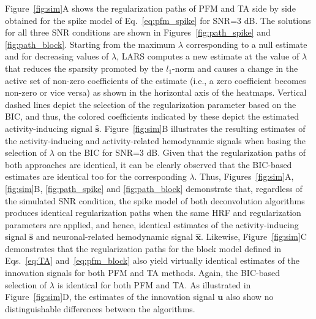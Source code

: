 Figure~\ref{fig:sim}A shows the regularization paths of PFM and TA side by side obtained for the spike model of Eq.~\eqref{eq:pfm_spike} for SNR=3 dB. The solutions for all three SNR conditions are shown in Figures~\ref{fig:path_spike} and \ref{fig:path_block}. Starting from the maximum $\lambda$ corresponding to a null estimate and for decreasing values of $\lambda$, LARS computes a new estimate at the value of $\lambda$ that reduces the sparsity promoted by the \(l_1\)-norm and causes a change in the active set of non-zero coefficients of the estimate (i.e., a zero coefficient becomes non-zero or vice versa) as shown in the horizontal axis of the heatmaps. Vertical dashed lines depict the selection of the regularization parameter based on the BIC, and thus, the colored coefficients indicated by these depict the estimated activity-inducing signal $\mathbf{\hat{{s}}}$. Figure~\ref{fig:sim}B illustrates the resulting estimates of the activity-inducing and activity-related hemodynamic signals when basing the selection of $\lambda$ on the BIC for SNR=3 dB. Given that the regularization paths of both approaches are identical, it can be clearly observed that the BIC-based estimates are identical too for the corresponding $\lambda$. Thus, Figures~\ref{fig:sim}A, \ref{fig:sim}B, \ref{fig:path_spike} and \ref{fig:path_block} demonstrate that, regardless of the simulated SNR condition, the spike model of both deconvolution algorithms produces identical regularization paths when the same HRF and regularization parameters are applied, and hence, identical estimates of the activity-inducing signal $\mathbf{\hat{{s}}}$ and neuronal-related hemodynamic signal $\mathbf{\hat{{x}}}$. Likewise, Figure~\ref{fig:sim}C demonstrates that the regularization paths for the block model defined in Eqs.~\eqref{eq:TA} and~\eqref{eq:pfm_block} also yield virtually identical estimates of the innovation signals for both PFM and TA methods. Again, the BIC-based selection of $\lambda$ is identical for both PFM and TA. As illustrated in Figure~\ref{fig:sim}D, the estimates of the innovation signal $\mathbf{u}$ also show no distinguishable differences between the algorithms. %

